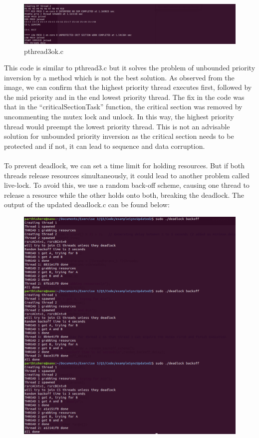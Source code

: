 \documentclass[a4paper,11pt]{article}%
\newenvironment{qanda}{\setlength{\parindent}{0pt}}{\bigskip}
\begin{document}
\begin{qanda}
\begin{enumerate}
\begin{enumerate}
\begin{enumerate}
								\begin{figure}[H]
									\centering
									\includegraphics[scale=0.6]{figures/pthread3ok_output.png}
									\caption{pthread3ok.c}
								\end{figure}
					            This code is similar to pthread3.c but it solves the problem of unbounded priority inversion by a method which is not the best solution. As observed from the image, we can confirm that the highest priority thread executes first, followed by the mid priority and in the end lowest priority thread. The fix in the code was that in the “criticalSectionTask” function, the critical section was removed by uncommenting the mutex lock and unlock. In this way, the highest priority thread would preempt the lowest priority thread. This is not an advisable solution for unbounded priority inversion as the critical section needs to be protected and if not, it can lead to sequence and data corruption.\\\\
					            To prevent deadlock, we can set a time limit for holding resources. But if both threads release resources simultaneously, it could lead to another problem called live-lock. To avoid this, we use a random back-off scheme, causing one thread to release a resource while the other holds onto both, breaking the deadlock. The output of the updated deadlock.c can be found below:
								\begin{figure}[H]
									\centering
									\includegraphics[scale=0.6]{figures/deadlock.png}

\end{figure}
\end{enumerate}
\end{enumerate}
\end{enumerate}
\end{qanda}
\end{document}
